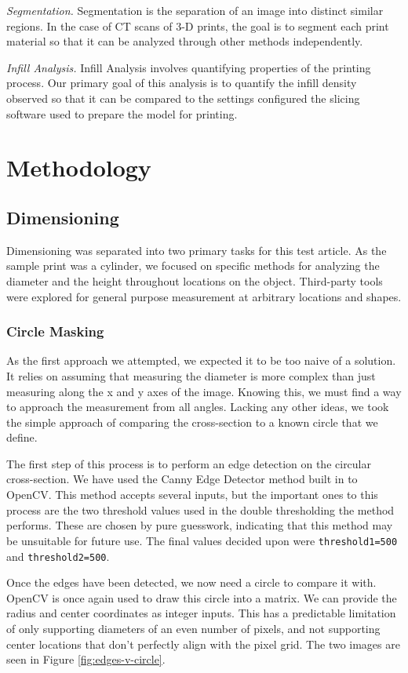 \documentclass[11pt, letterpaper]{article}
\begin{document}
    \emph{Segmentation.} Segmentation is the separation of an image into distinct similar regions. In the case of CT scans of 3-D prints, the goal is to segment each print material so that it can be analyzed through other methods independently.

    \emph{Infill Analysis.} Infill Analysis involves quantifying properties of the printing process. Our primary goal of this analysis is to quantify the infill density observed so that it can be compared to the settings configured the slicing software used to prepare the model for printing.

\section{Methodology}
\subsection{Dimensioning}
    Dimensioning was separated into two primary tasks for this test article. As the sample print was a cylinder, we focused on specific methods for analyzing the diameter and the height throughout locations on the object. Third-party tools were explored for general purpose measurement at arbitrary locations and shapes.

    \subsubsection{Circle Masking}
        As the first approach we attempted, we expected it to be too naive of a solution. It relies on assuming that measuring the diameter is more complex than just measuring along the x and y axes of the image. Knowing this, we must find a way to approach the measurement from all angles. Lacking any other ideas, we took the simple approach of comparing the cross-section to a known circle that we define.

        The first step of this process is to perform an edge detection on the circular cross-section. We have used the Canny Edge Detector method built in to OpenCV\cite{opencv_library}. This method accepts several inputs, but the important ones to this process are the two threshold values used in the double thresholding the method performs. These are chosen by pure guesswork, indicating that this method may be unsuitable for future use. The final values decided upon were \verb|threshold1=500| and \verb|threshold2=500|.

        Once the edges have been detected, we now need a circle to compare it with. OpenCV is once again used to draw this circle into a matrix. We can provide the radius and center coordinates as integer inputs. This has a predictable limitation of only supporting diameters of an even number of pixels, and not supporting center locations that don't perfectly align with the pixel grid. The two images are seen in Figure \ref{fig:edges-v-circle}.
\end{document}
